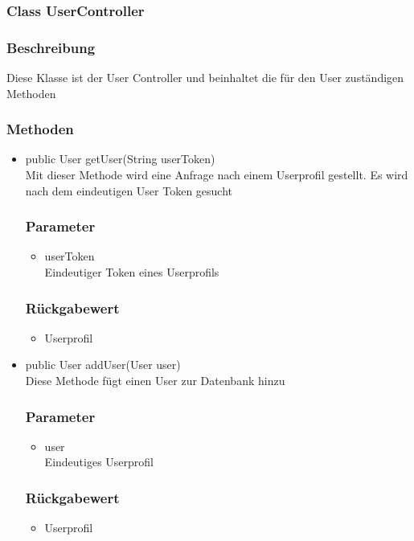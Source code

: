 \documentclass[a4paper]{scrreprt}
\begin{document}
\subsubsection{Class UserController}
\subsubsection*{Beschreibung}
Diese Klasse ist der User Controller und beinhaltet die für den User zuständigen Methoden

\subsubsection*{Methoden}
\begin{addmargin}[25pt]{0pt}
\begin{itemize}

\item public User getUser(String userToken)\\
	Mit dieser Methode wird eine Anfrage nach einem Userprofil gestellt. Es wird nach dem eindeutigen User Token gesucht
	\subsubsection*{Parameter}
	\begin{itemize}
	\item userToken \\
		Eindeutiger Token eines Userprofils
	\end{itemize}
	\subsubsection*{Rückgabewert}
	\begin{itemize}
	\item Userprofil
	\end{itemize}

\item public User addUser(User user)\\
	Diese Methode fügt einen User zur Datenbank hinzu
	\subsubsection*{Parameter}
	\begin{itemize}
	\item user \\
		Eindeutiges Userprofil
	\end{itemize}
	\subsubsection*{Rückgabewert}
	\begin{itemize}
	\item Userprofil
	\end{itemize}
	

\end{itemize}
\end{addmargin}
\end{document}

